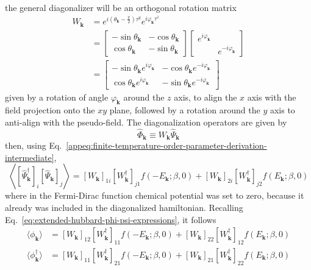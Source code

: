 the general diagonalizer will be an orthogonal rotation matrix
\begin{align}
	W_\mathbf{k} &= e^{i \left(\theta_\mathbf{k} - \frac{\pi}{2}\right) \tau^y} e^{i \varphi_\mathbf{k} \tau^z} \nonumber \\
	&= \begin{bmatrix}
		-\sin\theta_\mathbf{k}  & -\cos\theta_\mathbf{k}  \\ 
		\cos\theta_\mathbf{k}  & -\sin\theta_\mathbf{k} 
	\end{bmatrix} \begin{bmatrix}
		e^{i\varphi_\mathbf{k} } & \\ & e^{-i\varphi_\mathbf{k} }
	\end{bmatrix} \nonumber \\
	&= \begin{bmatrix}
		-\sin\theta_\mathbf{k}  e^{i\varphi_\mathbf{k} } & -\cos\theta_\mathbf{k}  e^{-i\varphi_\mathbf{k} }  \\ 
		\cos\theta_\mathbf{k}  e^{i\varphi_\mathbf{k} } & -\sin\theta_\mathbf{k}  e^{-i\varphi_\mathbf{k} } 
	\end{bmatrix} \label{eq:extended-hubbard-bogoliubov-W-diagonalizer-explicit}
\end{align}
given by a rotation of angle $\varphi_\mathbf{k}$ around the $z$ axis, to align the $x$ axis with the field projection onto the $xy$ plane, followed by a rotation around the $y$ axis to anti-align with the pseudo-field. The diagonalization operators are given by
\[
	\hat\Phi_\mathbf{k} \equiv W_\mathbf{k} \hat\Psi_\mathbf{k}
\]
then, using Eq.~\eqref{appeq:finite-temperature-order-parameter-derivation-intermediate}, 
\[
	\left\langle [\hat \Psi_\mathbf{k}^\dagger]_i [\hat \Psi_\mathbf{k}]_j \right\rangle = [W_\mathbf{k}]_{1 i} [W_\mathbf{k}^\dagger]_{j 1} f\left( -E_\mathbf{k}; \beta,0 \right) + [W_\mathbf{k}]_{2 i} [W_\mathbf{k}^\dagger]_{j 2} f\left( E_\mathbf{k}; \beta,0 \right)
\]
where in the Fermi-Dirac function chemical potential was set to zero, because it already was included in the diagonalized hamiltonian.
Recalling Eq.~\eqref{eq:extended-hubbard-phi-psi-expressions}, it follows
\begin{align}
	\langle \phi_\mathbf{k} \rangle &= [W_\mathbf{k}]_{12} [W_\mathbf{k}^\dagger]_{11} f\left( -E_\mathbf{k}; \beta,0 \right) + [W_\mathbf{k}]_{22} [W_\mathbf{k}^\dagger]_{12} f\left( E_\mathbf{k}; \beta,0 \right) \label{eq:pairing-expectation} \\
	\langle \phi_\mathbf{k}^\dagger \rangle &= [W_\mathbf{k}]_{11} [W_\mathbf{k}^\dagger]_{21} f\left( -E_\mathbf{k}; \beta,0 \right) + [W_\mathbf{k}]_{21} [W_\mathbf{k}^\dagger]_{22} f\left( E_\mathbf{k}; \beta,0 \right) \label{eq:pairing-dagger-expectation}
\end{align}
